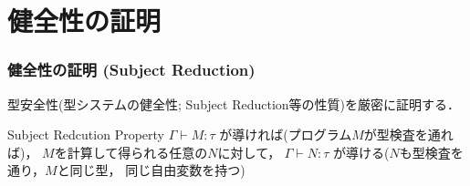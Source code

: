 
\begin{appendix}
\end{appendix}

\section{健全性の証明}

\begin{frame}[fragile]
  \frametitle{健全性の証明 (Subject Reduction)}

  型安全性(型システムの健全性; Subject Reduction等の性質)を厳密に証明する．

  \begin{block}{Subject Redcution Property}
    $\Gamma \vdash M: \tau$ が導ければ(プログラム$M$が型検査を通れば)，
    $M$を計算して得られる任意の$N$に対して，
    $\Gamma \vdash N: \tau$ が導ける($N$も型検査を通り，$M$と同じ型，
    同じ自由変数を持つ)
  \end{block}
\end{frame}

